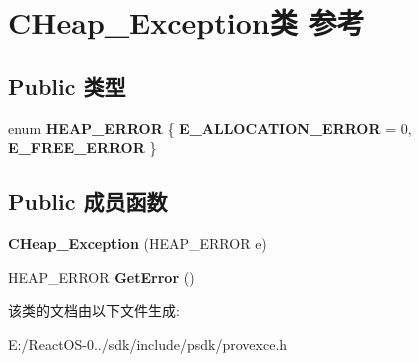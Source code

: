 \hypertarget{class_c_heap___exception}{}\section{C\+Heap\+\_\+\+Exception类 参考}
\label{class_c_heap___exception}
\subsection*{Public 类型}
\begin{DoxyCompactItemize}
\item 
\mbox{\label{class_c_heap___exception_a872421d04c4134432859717b57e11c40}} 
enum {\bfseries H\+E\+A\+P\+\_\+\+E\+R\+R\+OR} \{ {\bfseries E\+\_\+\+A\+L\+L\+O\+C\+A\+T\+I\+O\+N\+\_\+\+E\+R\+R\+OR} = 0, 
{\bfseries E\+\_\+\+F\+R\+E\+E\+\_\+\+E\+R\+R\+OR}
 \}
\end{DoxyCompactItemize}
\subsection*{Public 成员函数}
\begin{DoxyCompactItemize}
\item 
\mbox{\label{class_c_heap___exception_a4037d29de7954e76e39ff23f0f09d4b8}} 
{\bfseries C\+Heap\+\_\+\+Exception} (H\+E\+A\+P\+\_\+\+E\+R\+R\+OR e)
\item 
\mbox{\label{class_c_heap___exception_a170683021e417e2ff3b94aab2a902a85}} 
H\+E\+A\+P\+\_\+\+E\+R\+R\+OR {\bfseries Get\+Error} ()
\end{DoxyCompactItemize}


该类的文档由以下文件生成\+:\begin{DoxyCompactItemize}
\item 
E\+:/\+React\+O\+S-\/0../sdk/include/psdk/provexce.\+h\end{DoxyCompactItemize}

